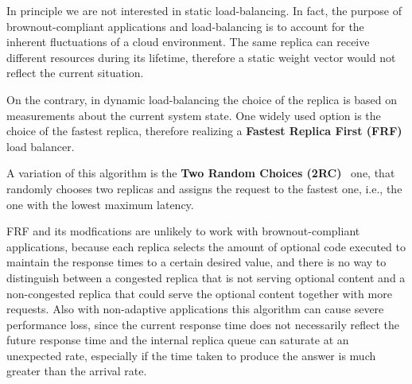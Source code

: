 In principle we are not interested in static load-balancing. In fact,
the purpose of brownout-compliant applications and load-balancing is
to account for the inherent fluctuations of a cloud environment. The
same replica can receive different resources during its lifetime,
therefore a static weight vector would not reflect the current
situation.

On the contrary, in dynamic load-balancing the choice of the replica
is based on measurements about the current system state. One widely
used option is the choice of the fastest replica, therefore realizing
a \textbf{Fastest Replica First (FRF)} load balancer.  

A variation of this algorithm is the \textbf{Two Random Choices
  (2RC)}~\cite{2RC} one, that randomly chooses two replicas and
assigns the request to the fastest one, i.e., the one with the lowest
maximum latency.

FRF and its modfications are unlikely to work with brownout-compliant
applications, because each replica selects the amount of optional code
executed to maintain the response times to a certain desired value,
and there is no way to distinguish between a congested replica that is
not serving optional content and a non-congested replica that could
serve the optional content together with more requests. Also with
non-adaptive applications this algorithm can cause severe performance
loss, since the current response time does not necessarily reflect the
future response time and the internal replica queue can saturate at an
unexpected rate, especially if the time taken to produce the answer is
much greater than the arrival rate.

